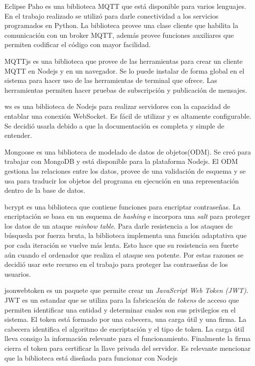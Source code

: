 Eclipse Paho es una biblioteca MQTT que está disponible para varios lenguajes.
En el trabajo realizado se utilizó para darle conectividad a los servicios programados en Python.
La biblioteca provee una clase cliente que habilita la comunicación con un broker MQTT, además provee funciones auxiliares que permiten codificar el código con mayor facilidad.

MQTTjs es una biblioteca que provee de las herramientas para crear un cliente MQTT en Nodejs y en un navegador.
Se lo puede instalar de forma global en el sistema para hacer uso de las herramientas de terminal que ofrece.
Las herramientas permiten hacer pruebas de subscripción y publicación de mensajes.

ws es una biblioteca de Nodejs para realizar servidores con la capacidad de entablar una conexión WebSocket.
Es fácil de utilizar y es altamente configurable.
Se decidió usarla debido a que la documentación es completa y simple de entender.

Mongoose es una biblioteca de modelado de datos de objetos(ODM).
Se creó para trabajar con MongoDB y está disponible para la plataforma Nodejs.
El ODM gestiona las relaciones entre los datos, provee de una validación de esquema y se usa para traducir los objetos del programa en ejecución en una representación dentro de la base de datos.

bcrypt es una biblioteca que contiene funciones para encriptar contraseñas.
La encriptación se basa en un esquema de \emph{hashing} e incorpora una \emph{salt} para proteger los datos de un ataque \emph{rainbow table}.
Para darle resistencia a los ataques de búsqueda por fuerza bruta, la biblioteca implementa una función adaptativa que por cada iteración se vuelve más lenta.
Esto hace que su resistencia sea fuerte aún cuando el ordenador que realiza el ataque sea potente.
Por estas razones se decidió usar este recurso en el trabajo para proteger las contraseñas de los usuarios.

jsonwebtoken es un paquete que permite crear un \emph{JavaScript Web Token (JWT)}.
JWT es un estandar que se utiliza para la fabricación de \emph{tokens} de acceso que permiten identificar una entidad y determinar cuales son sus privilegios en el sistema.
El token está formado por una cabecera, una carga útil y una firma.
La cabecera identifica el algoritmo de encriptación y el tipo de token.
La carga útil lleva consigo la información relevante para el funcionamiento.
Finalmente la firma cierra el token para certificar la llave privada del servidor.
Es relevante mencionar que la biblioteca está diseñada para funcionar con Nodejs

